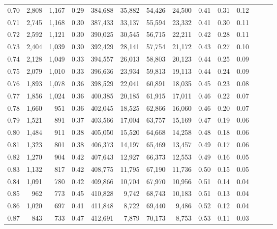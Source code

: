 \begin{tabular}{rrrrrrrrrrrrrr}
0.70 &   2,808 &  1,167 &  0.29 &  384,688 &   35,882 &  54,426 &  24,500 &  0.41 &  0.31 &      0.12 \\
0.71 &   2,745 &  1,168 &  0.30 &  387,433 &   33,137 &  55,594 &  23,332 &  0.41 &  0.30 &      0.11 \\
0.72 &   2,592 &  1,121 &  0.30 &  390,025 &   30,545 &  56,715 &  22,211 &  0.42 &  0.28 &      0.11 \\
0.73 &   2,404 &  1,039 &  0.30 &  392,429 &   28,141 &  57,754 &  21,172 &  0.43 &  0.27 &      0.10 \\
0.74 &   2,128 &  1,049 &  0.33 &  394,557 &   26,013 &  58,803 &  20,123 &  0.44 &  0.25 &      0.09 \\
0.75 &   2,079 &  1,010 &  0.33 &  396,636 &   23,934 &  59,813 &  19,113 &  0.44 &  0.24 &      0.09 \\
0.76 &   1,893 &  1,078 &  0.36 &  398,529 &   22,041 &  60,891 &  18,035 &  0.45 &  0.23 &      0.08 \\
0.77 &   1,856 &  1,024 &  0.36 &  400,385 &   20,185 &  61,915 &  17,011 &  0.46 &  0.22 &      0.07 \\
0.78 &   1,660 &    951 &  0.36 &  402,045 &   18,525 &  62,866 &  16,060 &  0.46 &  0.20 &      0.07 \\
0.79 &   1,521 &    891 &  0.37 &  403,566 &   17,004 &  63,757 &  15,169 &  0.47 &  0.19 &      0.06 \\
0.80 &   1,484 &    911 &  0.38 &  405,050 &   15,520 &  64,668 &  14,258 &  0.48 &  0.18 &      0.06 \\
0.81 &   1,323 &    801 &  0.38 &  406,373 &   14,197 &  65,469 &  13,457 &  0.49 &  0.17 &      0.06 \\
0.82 &   1,270 &    904 &  0.42 &  407,643 &   12,927 &  66,373 &  12,553 &  0.49 &  0.16 &      0.05 \\
0.83 &   1,132 &    817 &  0.42 &  408,775 &   11,795 &  67,190 &  11,736 &  0.50 &  0.15 &      0.05 \\
0.84 &   1,091 &    780 &  0.42 &  409,866 &   10,704 &  67,970 &  10,956 &  0.51 &  0.14 &      0.04 \\
0.85 &     962 &    773 &  0.45 &  410,828 &    9,742 &  68,743 &  10,183 &  0.51 &  0.13 &      0.04 \\
0.86 &   1,020 &    697 &  0.41 &  411,848 &    8,722 &  69,440 &   9,486 &  0.52 &  0.12 &      0.04 \\
0.87 &     843 &    733 &  0.47 &  412,691 &    7,879 &  70,173 &   8,753 &  0.53 &  0.11 &      0.03 \\

\end{tabular}
